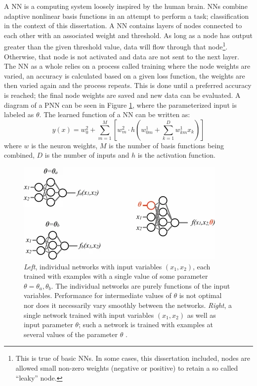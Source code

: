 		A \gls{NN} is a computing system loosely inspired by the human brain. NNs combine adaptive nonlinear basis functions in an attempt to perform a task; classification in the context of this dissertation. A NN contains layers of nodes connected to each other with an associated weight and threshold. As long as a node has output greater than the given threshold value, data will flow through that node\footnote{This is true of basic \glspl{NN}. In some cases, this dissertation included, nodes are allowed small non-zero weights (negative or positive) to retain a so called ``leaky'' node.}. Otherwise, that node is not activated and data are not sent to the next layer. The NN as a whole relies on a process called training where the node weights are varied, an accuracy is calculated based on a given loss function, the weights are then varied again and the process repeats. This is done until a preferred accuracy is reached; the final node weights are saved and new data can be evaluated. A diagram of a \gls{PNN} can be seen in Figure \ref{fig:PNN-diagram}, where the parameterized input is labeled as $\theta$. The learned function of a NN can be written as:
		\begin{equation}
		y(x) = w_{0}^{2} + \sum^{M}_{m=1}[ w^{2}_{m} \cdot h (w_{0m}^{1} + \sum^{D}_{k=1} w^{1}_{km} x_{k}  )]
		\end{equation}
		where $w$ is the neuron weights, $M$ is the number of basis functions being combined, $D$ is the number of inputs and $h$ is the activation function.

		\begin{figure}	
			\begin{center}
				\includegraphics[width=.6\textwidth,keepaspectratio=true]{chapters/chapter6_HPlus/images/PNN_Diagram.png}
			\end{center}
			\caption{\textit{Left}, individual networks with input variables $(x_{1},x_{2})$, each trained with examples with a single value of some parameter $\theta = \theta_{a}, \theta_{b}$. The individual networks are purely functions of the input variables. Performance for intermediate values of $\theta$ is not optimal nor does it necessarily vary smoothly between the networks. \textit{Right}, a single network trained with input variables $(x_{1},x_{2})$ as well as input parameter $\theta$; such a network is trained with examples at several values of the parameter $\theta$ \cite{PNN}.}
			\label{fig:PNN-diagram}
		\end{figure}	

